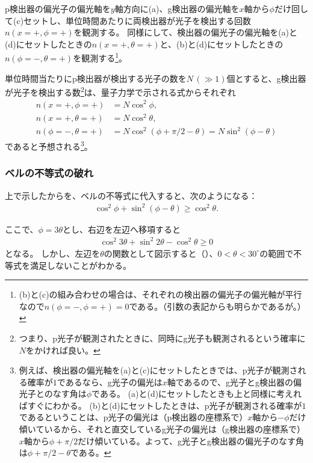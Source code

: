 \documentclass[10pt,b5paper,papersize,dvipdfmx]{jsbook}
\begin{document}
p検出器の偏光子の偏光軸を$y$軸方向に(a)、g検出器の偏光軸を$x$軸から$\phi$だけ回して(c)セットし、単位時間あたりに両検出器が光子を検出する回数$n(x=+,\phi=+)$を観測する。
同様にして、検出器の偏光子の偏光軸を(a)と(d)にセットしたときの$n(x=+,\theta=+)$と、(b)と(d)にセットしたときの$n(\phi=-,\theta=+)$を観測する\footnote{
  (b)と(c)の組み合わせの場合は、それぞれの検出器の偏光子の偏光軸が平行なので$n(\phi=-, \phi=+) = 0$である。（引数の表記からも明らかであるが。）
}。\par
単位時間当たりにp検出器が検出する光子の数を$N \,(\gg 1)$個とすると、g検出器が光子を検出する数\footnote{
  つまり、p光子が観測されたときに、同時にg光子も観測されるという確率に$N$をかければ良い。
}は、量子力学で示される式からそれぞれ
\begin{align}
  \label{eq:photon-1} n(x=+,\phi=+)      &= N \cos^2\phi, \\
  \label{eq:photon-2} n(x=+,\theta=+)    &= N \cos^2\theta, \\
  \label{eq:photon-3} n(\phi=-,\theta=+) &= N \cos^2(\phi + \pi/2 - \theta) = N \sin^2(\phi - \theta)
\end{align}
であると予想される\footnote{
  例えば、検出器の偏光軸を(a)と(c)にセットしたときでは、p光子が観測される確率が$1$であるなら、g光子の偏光は$x$軸であるので、g光子とg検出器の偏光子とのなす角は$\phi$である。
  (a)と(d)にセットしたときも上と同様に考えればすぐにわかる。
  (b)と(d)にセットしたときは、p光子が観測される確率が$1$であるということは、p光子の偏光は（p検出器の座標系で）$x$軸から$-\phi$だけ傾いているから、それと直交しているg光子の偏光は（g検出器の座標系で）$x$軸から$\phi + \pi/2$だけ傾いている。よって、g光子とg検出器の偏光子のなす角は$\phi + \pi/2 - \theta$である。
}。

%
\subsubsection{ベルの不等式の破れ} %

上で示したからを、ベルの不等式に代入すると、次のようになる：
\begin{align*}
  \cos^2\phi + \sin^2(\phi - \theta) \ge \cos^2\theta.
\end{align*}

ここで、$\phi = 3\theta$とし、右辺を左辺へ移項すると
\begin{align}
  \cos^2 3\theta + \sin^2 2\theta - \cos^2\theta \ge 0
\end{align}
となる。
しかし、左辺を$\theta$の関数として図示すると（）、$0 < \theta < 30^\circ$の範囲で不等式を満足しないことがわかる。
\end{document}

